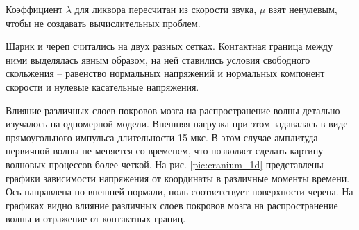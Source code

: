Коэффициент $\lambda$ для ликвора пересчитан из скорости звука, $\mu$ взят ненулевым, чтобы не создавать вычислительных проблем.

Шарик и череп считались на двух разных сетках. Контактная граница между ними выделялась явным образом, на ней ставились условия свободного скольжения – равенство нормальных напряжений и нормальных компонент скорости и нулевые касательные напряжения.


Влияние различных слоев покровов мозга на распространение волны детально изучалось на одномерной модели. Внешняя нагрузка при этом задавалась в виде прямоугольного импульса длительности 15 мкс. В этом случае амплитуда первичной волны не меняется со временем, что позволяет сделать картину волновых процессов более четкой. На рис. \ref{pic:cranium_1d} представлены графики зависимости напряжения от координаты в различные моменты времени. Ось направлена по внешней нормали, ноль соответствует поверхности черепа. На графиках видно влияние различных слоев покровов мозга на распространение волны и отражение от контактных границ.

